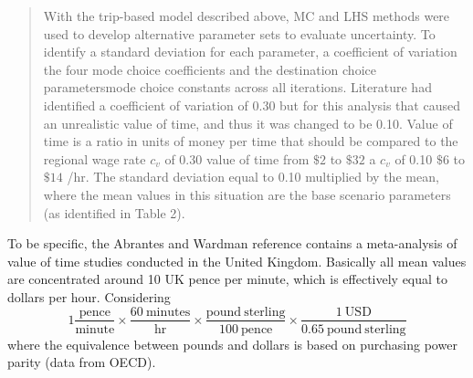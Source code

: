 \documentclass{ar2rc}
\begin{document}
\begin{quote}
    With the trip-based model described above, MC and LHS methods were used
    to develop alternative parameter sets to evaluate uncertainty. To
    identify a standard deviation for each parameter, \DIFaddbegin {}\DIFaddend a coefficient of
    variation \DIFdelbegin {}\DIFdelend \DIFaddbegin {}\DIFaddend the four mode choice coefficients and the destination
    choice parameters\DIFdelbegin {}\DIFdelend \DIFaddbegin {}\DIFaddend mode choice constants \DIFdelbegin {}\DIFdelend \DIFaddbegin {}\DIFaddend across all iterations.
    Literature had identified a coefficient of variation of 0.30 \DIFdelbegin \DIFdel{, }\DIFdelend \DIFaddbegin {}\DIFaddend but for
    this analysis that caused an unrealistic value of time, and thus it was
    changed to be 0.10\DIFdelbegin {}\DIFdelend . Value of time is a ratio
    in units of money per time that should be compared to the regional wage
    rate \DIFdelbegin {}\DIFdelend \DIFaddbegin {}\DIFaddend \(c_v\) of 0.30 \DIFdelbegin {}\DIFdelend \DIFaddbegin {}\DIFaddend value of time
    \DIFdelbegin {}\DIFdelend \DIFaddbegin {}\DIFaddend from \(\$2\)
    to \(\$32\) \DIFdelbegin {}\DIFdelend \DIFaddbegin {}\DIFaddend a \(c_v\) of 0.10 \DIFdelbegin {}\DIFdelend \DIFaddbegin {}\DIFaddend \(\$6\)
    to \(\$14\) /hr\DIFdelbegin {}\DIFdelend \DIFaddbegin {}\DIFaddend .
    The standard deviation \DIFdelbegin {}\DIFdelend \DIFaddbegin {}\DIFaddend equal to 0.10
    multiplied by the mean, where the mean values in this situation are the base
    scenario parameters (as identified in Table 2).
\end{quote}

\AR To be specific, the Abrantes and Wardman reference contains a meta-analysis of value of time studies
conducted in the United Kingdom. Basically all mean values are concentrated 
around 10 UK pence per minute, which is effectively equal to dollars per hour. Considering 
\begin{equation}
  1 \frac{\mathrm{pence}}{\mathrm{minute}} \times \frac{60\ \mathrm{minutes}}{\mathrm{hr}} 
    \times \frac{\mathrm{pound\ sterling}}{100 \mathrm{\ pence}} \times \frac{1 \mathrm{\ USD}}{0.65 \mathrm{\ pound\ sterling}}
\end{equation}
where the equivalence between pounds and dollars is based on purchasing power parity (data from OECD).
\end{document}
